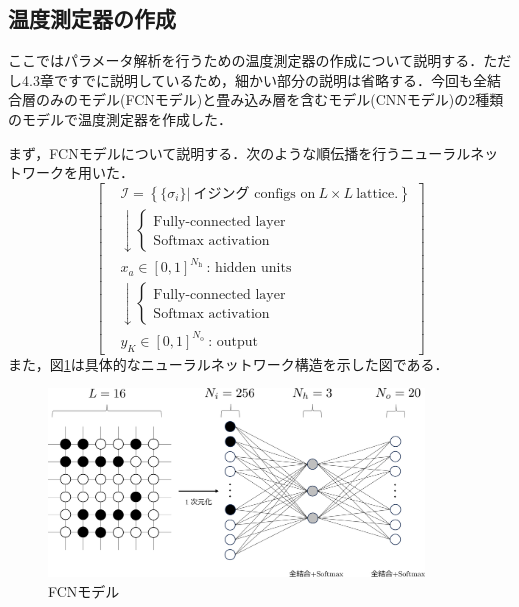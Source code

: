 \documentclass[a4paper,11pt]{jsreport}
\begin{document}
\subsection{温度測定器の作成}
ここではパラメータ解析を行うための温度測定器の作成について説明する．ただし4.3章ですでに説明しているため，細かい部分の説明は省略する．今回も全結合層のみのモデル(FCNモデル)と畳み込み層を含むモデル(CNNモデル)の2種類のモデルで温度測定器を作成した．\par
まず，FCNモデルについて説明する．次のような順伝播を行うニューラルネットワークを用いた．
\begin{equation}
  \left[
    \begin{aligned}
       & \mathcal{I} = \left\{ \{ \sigma_i \} \Big| \ \text{イジング configs on} \ L \times L \ \text{lattice.} \right\} \\
       & \downarrow
      \begin{cases}
        \text{Fully-connected layer} \\
        \text{Softmax activation}
      \end{cases}                                                                            \\
       & x_a \in [0,1]^{N_{\text{h}}} \ \text{: hidden units}                                                                  \\
       & \downarrow
      \begin{cases}
        \text{Fully-connected layer} \\
        \text{Softmax activation}
      \end{cases}                                                                            \\
       & y_K \in [0,1]^{N_{\text{o}}} \ \text{: output}
    \end{aligned}
    \right]
\end{equation}
また，図\ref{温度測定器FCN2}は具体的なニューラルネットワーク構造を示した図である．

\begin{figure}[H]
  \begin{center}
      \includegraphics[height=5cm]{image/温度測定器FCN2.png}
      \caption{FCNモデル}
      \label{温度測定器FCN2}
  \end{center}
\end{figure}
\end{document}
